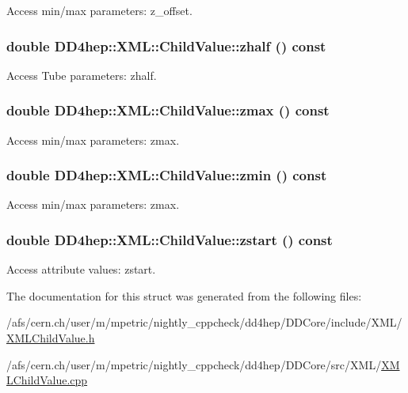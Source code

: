 Access min/max parameters: z\_\-offset. \hypertarget{struct_d_d4hep_1_1_x_m_l_1_1_child_value_ac41a817524ba5fa00eab5c6099d07cdc}{
\subsubsection[{zhalf}]{\setlength{\rightskip}{0pt plus 5cm}double DD4hep::XML::ChildValue::zhalf () const}}
\label{struct_d_d4hep_1_1_x_m_l_1_1_child_value_ac41a817524ba5fa00eab5c6099d07cdc}


Access Tube parameters: zhalf. \hypertarget{struct_d_d4hep_1_1_x_m_l_1_1_child_value_aa90d2bbccc9bc4ff6c495ef2ae2c26e5}{
\subsubsection[{zmax}]{\setlength{\rightskip}{0pt plus 5cm}double DD4hep::XML::ChildValue::zmax () const}}
\label{struct_d_d4hep_1_1_x_m_l_1_1_child_value_aa90d2bbccc9bc4ff6c495ef2ae2c26e5}


Access min/max parameters: zmax. \hypertarget{struct_d_d4hep_1_1_x_m_l_1_1_child_value_abfa3a9c8cdaf79f82be50a441e1ec7ca}{
\subsubsection[{zmin}]{\setlength{\rightskip}{0pt plus 5cm}double DD4hep::XML::ChildValue::zmin () const}}
\label{struct_d_d4hep_1_1_x_m_l_1_1_child_value_abfa3a9c8cdaf79f82be50a441e1ec7ca}


Access min/max parameters: zmax. \hypertarget{struct_d_d4hep_1_1_x_m_l_1_1_child_value_ab33e2fea13f50317a46c4df3da8ed421}{
\subsubsection[{zstart}]{\setlength{\rightskip}{0pt plus 5cm}double DD4hep::XML::ChildValue::zstart () const}}
\label{struct_d_d4hep_1_1_x_m_l_1_1_child_value_ab33e2fea13f50317a46c4df3da8ed421}


Access attribute values: zstart. 

The documentation for this struct was generated from the following files:\begin{DoxyCompactItemize}
\item 
/afs/cern.ch/user/m/mpetric/nightly\_\-cppcheck/dd4hep/DDCore/include/XML/\hyperlink{_x_m_l_child_value_8h}{XMLChildValue.h}\item 
/afs/cern.ch/user/m/mpetric/nightly\_\-cppcheck/dd4hep/DDCore/src/XML/\hyperlink{_x_m_l_child_value_8cpp}{XMLChildValue.cpp}\end{DoxyCompactItemize}
